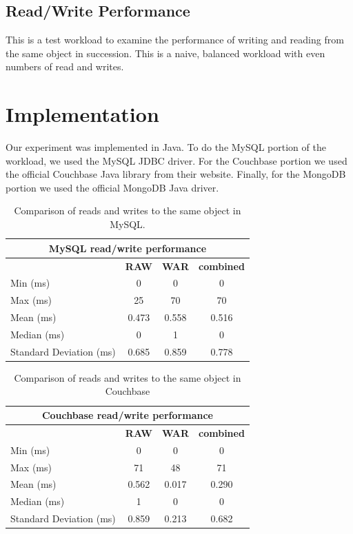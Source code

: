 \documentclass[12pt]{ucthesis}
\begin{document}
\subsection{Read/Write Performance}
This is a test workload to examine the performance of writing and reading from
the same object in succession. This is a naive, balanced workload with even numbers
of read and writes.

\section{Implementation}\label{sec:implementation}
Our experiment was implemented in Java. To do the MySQL portion of
the workload, we used the MySQL JDBC driver. For the Couchbase portion we used
the official Couchbase Java library from their website. Finally, for the MongoDB portion
we used the official MongoDB Java driver.

\begin{table}[t]
   \centering
      \begin{tabular}{| l | c | c | c |}
         \hline
            \multicolumn{4}{|c|}{{\textbf{MySQL read/write performance}}} \\
         \hline
            & \textbf{RAW} & \textbf{WAR} & \textbf{combined} \\
         \hline
            Min (ms) & 0 & 0 & 0 \\
         \hline
            Max (ms) & 25 & 70 & 70 \\
         \hline
            Mean (ms) & 0.473 & 0.558 & 0.516 \\
         \hline
            Median (ms) & 0 & 1 & 0 \\
         \hline
            Standard Deviation (ms) & 0.685 & 0.859 & 0.778 \\
         \hline
      \end{tabular}
      \caption{Comparison of reads and writes to the same object in MySQL.}
      \label{tab:sql_perf}
\end{table}

\begin{table}[t]
   \centering
      \begin{tabular}{| l | c | c | c |}
         \hline
            \multicolumn{4}{|c|}{{\textbf{Couchbase read/write performance}}} \\
         \hline
            & \textbf{RAW} & \textbf{WAR} & \textbf{combined} \\
         \hline
            Min (ms) & 0 & 0 & 0 \\
         \hline
            Max (ms) & 71 & 48 & 71 \\
         \hline
            Mean (ms) & 0.562 & 0.017 & 0.290 \\
         \hline
            Median (ms) & 1 & 0 & 0 \\
         \hline
            Standard Deviation (ms) & 0.859 & 0.213 & 0.682 \\
         \hline
      \end{tabular}
      \caption{Comparison of reads and writes to the same object in Couchbase}
      \label{tab:couch_perf}
\end{table}
\end{document}

